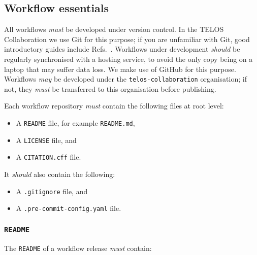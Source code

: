 \documentclass{article}
\newcommand\rfcword[1]{\emph{#1}\xspace}
\newcommand\must{\rfcword{must}}
\newcommand\should{\rfcword{should}}
\newcommand\may{\rfcword{may}}
\newcommand\filename[1]{\texttt{#1}\xspace}
\newcommand\readme{\filename{README}\xspace}
\begin{document}
\subsection{Workflow essentials}

All workflows \must be developed under version control.
In the TELOS Collaboration we use Git for this purpose;
if you are unfamiliar with Git,
good introductory guides include Refs.~\cite{swc-git,chacon2014pro}.
Workflows under development \should be regularly synchronised with a hosting service,
to avoid the only copy being on a laptop that may suffer data loss.
We make use of GitHub for this purpose.
Workflows \may be developed under the \texttt{telos-collaboration} organisation;
if not,
they \must be transferred to this organisation before publishing.

Each workflow repository \must contain the following files at root level:

\begin{itemize}
  \item A \readme file, for example \filename{README.md},
  \item A \filename{LICENSE} file, and
  \item A \filename{CITATION.cff} file.
\end{itemize}

It \should also contain the following:

\begin{itemize}
  \item A \filename{.gitignore} file, and
  \item A \filename{.pre-commit-config.yaml} file.
\end{itemize}

\subsubsection{\readme}

The \readme of a workflow release \must contain:
\end{document}
